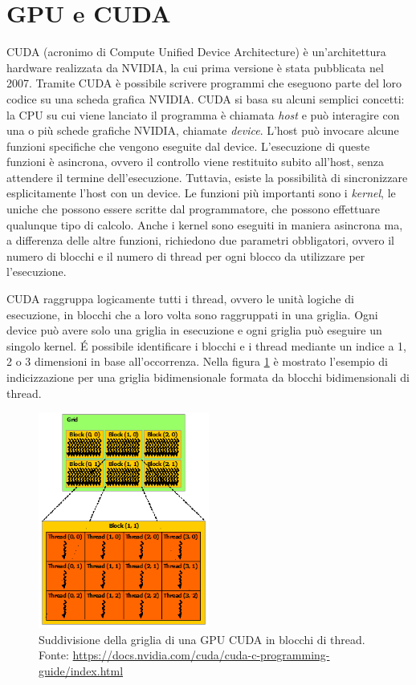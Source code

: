 \documentclass[12pt,a4paper,oneside]{book}
\begin{document}
	\section{GPU e CUDA}
	\label{section:cuda}
	CUDA (acronimo di Compute Unified Device Architecture) è un'architettura hardware realizzata da NVIDIA, la cui prima versione è stata pubblicata nel 2007. Tramite CUDA è possibile scrivere programmi che eseguono parte del loro codice su una scheda grafica NVIDIA. CUDA si basa su alcuni semplici concetti: la CPU su cui viene lanciato il programma è chiamata \textit{host} e può interagire con una o più schede grafiche NVIDIA, chiamate \textit{device}. L'host può invocare alcune funzioni specifiche che vengono eseguite dal device. L'esecuzione di queste funzioni è asincrona, ovvero il controllo viene restituito subito all'host, senza attendere il termine dell'esecuzione. Tuttavia, esiste la possibilità di sincronizzare esplicitamente l'host con un device. Le funzioni più importanti sono i \textit{kernel}, le uniche che possono essere scritte dal programmatore, che possono effettuare qualunque tipo di calcolo. Anche i kernel sono eseguiti in maniera asincrona ma, a differenza delle altre funzioni, richiedono due parametri obbligatori, ovvero il numero di blocchi e il numero di thread per ogni blocco da utilizzare per l'esecuzione.
	
	CUDA raggruppa logicamente tutti i thread, ovvero le unità logiche di esecuzione, in blocchi che a loro volta sono raggruppati in una griglia. Ogni device può avere solo una griglia in esecuzione e ogni griglia può eseguire un singolo kernel. \'E possibile identificare i blocchi e i thread mediante un indice a 1, 2 o 3 dimensioni in base all'occorrenza. Nella figura \ref{fig:grid-of-thread-blocks} è mostrato l'esempio di indicizzazione per una griglia bidimensionale formata da blocchi bidimensionali di thread.
	
	\begin{figure}[!ht]
		\centering
		\includegraphics[width=0.5\textwidth]{grid-of-thread-blocks}
		\caption[Struttura della griglia di una GPU CUDA]{Suddivisione della griglia di una GPU CUDA in blocchi di thread. Fonte: \url{https://docs.nvidia.com/cuda/cuda-c-programming-guide/index.html}}
		\label{fig:grid-of-thread-blocks}
	\end{figure}
	
\end{document}
